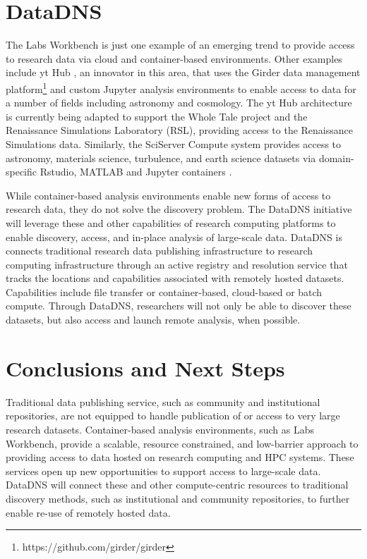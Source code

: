 \documentclass{sig-alternate}
\begin{document}
\section{DataDNS}

The Labs Workbench is just one example of an emerging trend to provide access to research data via cloud and container-based environments.  Other examples include yt Hub \cite{zuhone2016galaxy}, an innovator in this area, that uses the Girder data management platform\footnote{https://github.com/girder/girder} and custom Jupyter analysis environments to enable access to data for a number of fields including astronomy and cosmology. The yt Hub architecture is currently being adapted to support the Whole Tale project \cite{ludaescher2016capturing} and the Renaissance Simulations Laboratory (RSL), providing access to the Renaissance Simulations data\cite{2041-8205-807-1-L12}.  Similarly, the SciServer Compute system provides access to astronomy, materials science, turbulence, and earth science datasets via domain-specific Rstudio, MATLAB and Jupyter containers \cite{Medvedev:2016:SCB:2949689.2949700}.  

While container-based analysis environments enable new forms of access to research data, they do not solve the discovery problem. The DataDNS initiative will leverage these and other capabilities of research computing platforms to enable discovery, access, and in-place analysis of large-scale data. DataDNS is connects traditional research data publishing infrastructure to research computing infrastructure through an active registry and resolution service that tracks the locations and capabilities associated with remotely hosted datasets. Capabilities include file transfer or container-based, cloud-based or batch compute. Through DataDNS, researchers will not only be able to discover these datasets, but also access and launch remote analysis, when possible.   


\section{Conclusions and Next Steps}

Traditional data publishing service, such as community and institutional repositories, are not equipped to handle publication of or access to very large research datasets.  Container-based analysis environments, such as Labs Workbench, provide a scalable, resource constrained, and low-barrier approach to providing access to data hosted on research computing and HPC systems. These services open up  new opportunities to support access to large-scale data.  DataDNS will connect these and other compute-centric resources to traditional discovery methods, such as institutional and community repositories, to further enable re-use of remotely hosted data.
\end{document}
